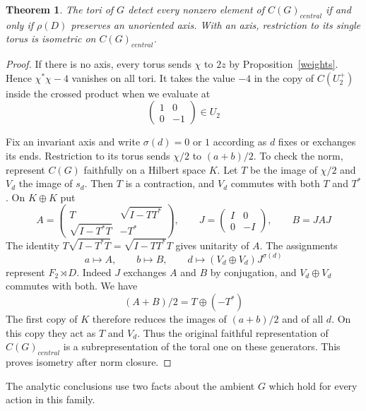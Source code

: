 \documentclass[11pt,a4paper]{article}
\newtheorem{thm}{Theorem}[section]
\theoremstyle{remark}
\begin{document}
\begin{thm}\label{axis}
The tori of $G$ detect every nonzero element of $C(G)_{central}$ if and only if
$\rho(D)$ preserves an unoriented axis. With an axis, restriction to its
single torus is isometric on $C(G)_{central}$.
\end{thm}
\begin{proof}
If there is no axis, every torus sends $\chi$ to $2z$ by
Proposition~\ref{weights}. Hence $\chi^*\chi-4$ vanishes on all tori.
It takes the value $-4$ in the copy of $C(U_2^+)$ inside the crossed
product when we evaluate at
\[
 \begin{pmatrix}1&0\\0&-1\end{pmatrix}\in U_2
\]

Fix an invariant axis and write $\sigma(d)=0$ or $1$ according as $d$
fixes or exchanges its ends. Restriction to its torus sends
$\chi/2$ to $(a+b)/2$. To check the norm, represent $C(G)$ faithfully
on a Hilbert space $K$. Let $T$ be the image of $\chi/2$ and $V_d$ the
image of $s_d$. Then $T$ is a contraction, and $V_d$ commutes with
both $T$ and $T^*$. On $K\oplus K$ put
\[
 A=\begin{pmatrix}T&\sqrt{I-TT^*}\\
                   \sqrt{I-T^*T}&-T^*\end{pmatrix},\qquad
 J=\begin{pmatrix}I&0\\0&-I\end{pmatrix},\qquad B=JAJ
\]
The identity $T\sqrt{I-T^*T}=\sqrt{I-TT^*}T$ gives unitarity of $A$.
The assignments
\[
 a\mapsto A,\qquad b\mapsto B,\qquad
 d\mapsto (V_d\oplus V_d)J^{\sigma(d)}
\]
represent $F_2\rtimes D$. Indeed $J$ exchanges $A$ and $B$ by conjugation,
and $V_d\oplus V_d$ commutes with both. We have
\[
 (A+B)/2=T\oplus(-T^*)
\]
The first copy of $K$ therefore reduces the images of $(a+b)/2$ and
of all $d$. On this copy they act as $T$ and $V_d$. Thus the original
faithful representation of $C(G)_{central}$ is a subrepresentation of the toral
one on these generators. This proves isometry after norm closure.
\end{proof}

The analytic conclusions use two facts about the ambient $G$ which hold
for every action in this family.
\end{document}

